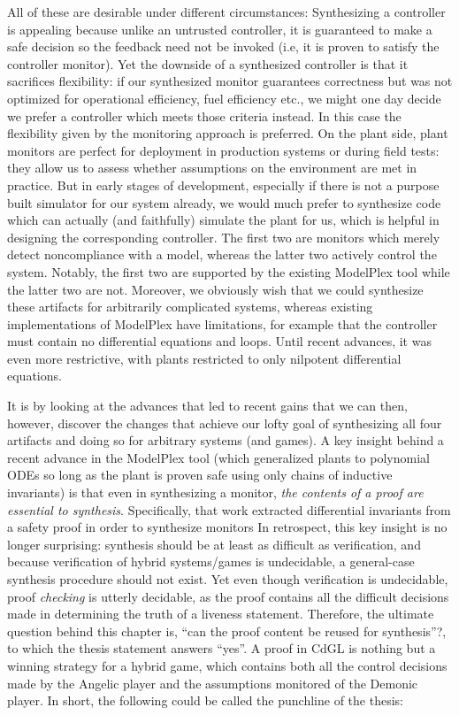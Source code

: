 \documentclass[12pt]{cmuthesis}
\theoremstyle{definition}
\theoremstyle{remark}
\newcommand{\CdGL}{\textsf{CdGL}\xspace}
\newcommand{\ModelPlex}{ModelPlex\xspace}
\begin{document}
All of these are desirable under different circumstances:
Synthesizing a controller is appealing because unlike an untrusted controller, it is guaranteed to make a safe decision so the feedback need not be invoked (i.e, it is proven to satisfy the controller monitor).
Yet the downside of a synthesized controller is that it sacrifices flexibility: if our synthesized monitor guarantees correctness but was not optimized for operational efficiency, fuel efficiency etc., we might one day decide we prefer a controller which meets those criteria instead.
In this case the flexibility given by the monitoring approach is preferred.
On the plant side, plant monitors are perfect for deployment in production systems or during field tests: they allow us to assess whether assumptions on the environment are met in practice.
But in early stages of development, especially if there is not a purpose built simulator for our system already, we would much prefer to synthesize code which can actually (and faithfully) simulate the plant for us, which is helpful in designing the corresponding controller.
The first two are monitors which merely detect noncompliance with a model, whereas the latter two actively control the system.
Notably, the first two are supported by the existing \ModelPlex tool while the latter two are not.
Moreover, we obviously wish that we could synthesize these artifacts for arbitrarily complicated systems, whereas existing implementations of \ModelPlex have limitations, for example that the controller must contain no differential equations and loops.
Until recent advances, it was even more restrictive, with plants restricted to only nilpotent differential equations.

It is by looking at the advances that led to recent gains that we can then, however, discover the changes that achieve our lofty goal of synthesizing all four artifacts and doing so for arbitrary systems (and games).
A key insight behind a recent advance in the \ModelPlex tool (which generalized plants to polynomial ODEs so long as the plant is proven safe using only chains of inductive invariants) is that even in synthesizing a monitor, \emph{the contents of a proof are essential to synthesis}.
Specifically, that work extracted differential invariants from a safety proof in order to synthesize monitors
In retrospect, this key insight is no longer surprising: synthesis should be at least as difficult as verification, and because verification of hybrid systems/games is undecidable, a general-case synthesis procedure should not exist.
Yet even though verification is undecidable, proof \emph{checking} is utterly decidable, as the proof contains all the difficult decisions made in determining the truth of a liveness statement.
Therefore, the ultimate question behind this chapter is, ``can the proof content be reused for synthesis''?, to which the thesis statement answers ``yes''.
A proof in \CdGL is nothing but a winning strategy for a hybrid game, which contains both all the control decisions made by the Angelic player and the assumptions monitored of the Demonic player.
In short, the following could be called the punchline of the thesis:
\end{document}
